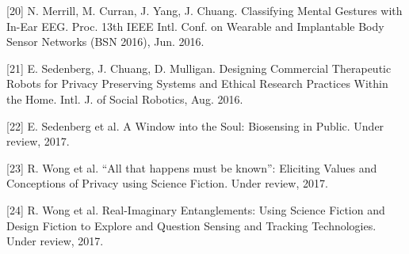 \documentclass[11pt]{article}
\begin{document}
[20]
N. Merrill, M. Curran, J. Yang, J. Chuang. Classifying Mental Gestures with In-Ear EEG.
Proc. 13th IEEE Intl. Conf. on Wearable and Implantable Body Sensor Networks (BSN
2016), Jun. 2016.

[21]
E. Sedenberg, J. Chuang, D. Mulligan. Designing Commercial Therapeutic Robots for
Privacy Preserving Systems and Ethical Research Practices Within the Home. Intl. J. of
Social Robotics, Aug. 2016.

[22] E. Sedenberg et al. A Window into the Soul: Biosensing in Public. Under review, 2017.

[23] R. Wong et al. “All that happens must be known”: Eliciting Values and Conceptions of
Privacy using Science Fiction. Under review, 2017.

[24]
R. Wong et al. Real-Imaginary Entanglements: Using Science Fiction and Design Fiction to
Explore and Question Sensing and Tracking Technologies. Under review, 2017.
\end{document}
